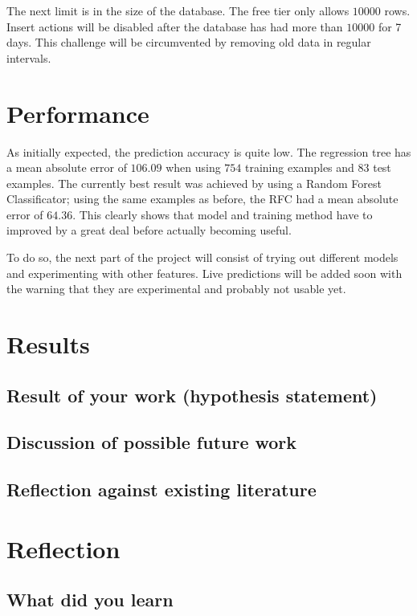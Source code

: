 \documentclass[journal,10pt]{IEEEtran}
\begin{document}
The next limit is in the size of the database. The free tier only allows \(10000\) rows. Insert actions will be disabled after the database has had more than \(10000\) for 7 days. This challenge will be circumvented by removing old data in regular intervals.



\section{Performance}
As initially expected, the prediction accuracy is quite low. The regression tree has a mean absolute error of \(106.09\) when using \(754\) training examples and \(83\) test examples. The currently best result was achieved by using a Random Forest Classificator; using the same examples as before, the RFC had a mean absolute error of \(64.36\). This clearly shows that model and training method have to improved by a great deal before actually becoming useful. 

To do so, the next part of the project will consist of trying out different models and experimenting with other features. Live predictions will be added soon with the warning that they are experimental and probably not usable yet.



%
%

\section{Results}

\subsection{Result of your work (hypothesis statement)}

\subsection{Discussion of possible future work}

\subsection{Reflection against existing literature}



\section{Reflection}

\subsection{What did you learn}


  

\end{document}
